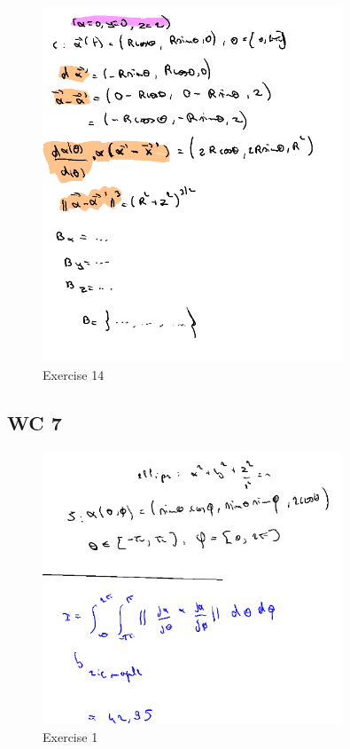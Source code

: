 \documentclass[a4paper]{report}
\begin{document}
\begin{figure}[H]
	\centering
	\includegraphics[width=0.8\textwidth]{assets/2024-11-10-11-45-23.png}
	\caption{Exercise 14}
	\label{fig:2024-11-10-11-45-23}
\end{figure}

\subsection*{WC 7}

\begin{figure}[H]
	\centering
	\includegraphics[width=0.8\textwidth]{assets/huis_7_ex_1.png}
	\caption{Exercise 1}
	\label{fig:wc_7_ex_1}
\end{figure}
\end{document}
